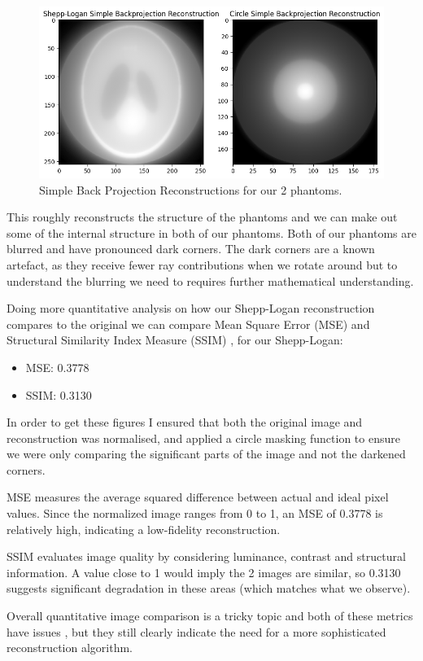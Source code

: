 \documentclass{article}
\theoremstyle{definition}
\begin{document}
\begin{figure}[H]
	\includegraphics[width=\linewidth]{sbpreconstructions.png}
	\caption{Simple Back Projection Reconstructions for our 2 phantoms.}
	\label{fig:SBPreconstructions}
\end{figure}

This roughly reconstructs the structure of the phantoms and we can make out some of the internal structure in both of our phantoms. Both of our phantoms are blurred and have pronounced dark corners. The dark corners are a known artefact, as they receive fewer ray contributions when we rotate around but to understand the blurring we need to requires further mathematical understanding.

Doing more quantitative analysis on how our Shepp-Logan reconstruction compares to the original we can compare Mean Square Error (MSE) and Structural Similarity Index Measure (SSIM) \cite{Sara_Akter_Uddin_2019}, for our Shepp-Logan:
\begin{itemize}
	\item MSE: 0.3778
	\item SSIM: 0.3130
\end{itemize}

In order to get these figures I ensured that both the original image and reconstruction was normalised, and applied a circle masking function to ensure we were only comparing the significant parts of the image and not the darkened corners.

MSE measures the average squared difference between actual and ideal pixel values. Since the normalized image ranges from 0 to 1, an MSE of 0.3778 is relatively high, indicating a low-fidelity reconstruction.

SSIM evaluates image quality by considering luminance, contrast and structural information. A value close to 1 would imply the 2 images are similar, so 0.3130 suggests significant degradation in these areas (which matches what we observe).

Overall quantitative image comparison is a tricky topic and both of these metrics have issues \cite{nilsson2020understandingssim}, but they still clearly indicate the need for a more sophisticated reconstruction algorithm.



\end{document}
